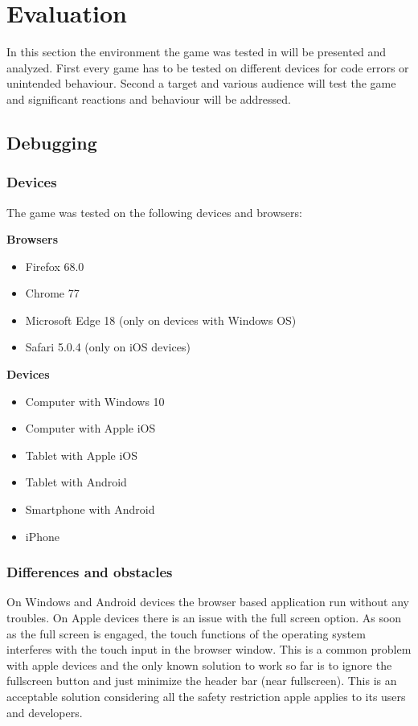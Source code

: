 
\chapter{Evaluation}\label{ch:evaluation}
In this section the environment the game was tested in will be presented and analyzed.
First every game has to be tested on different devices for code errors or unintended behaviour.
Second a target and various audience will test the game and significant reactions and behaviour will be addressed.

\section{Debugging}\label{sec:debugging}
\subsection{Devices}\label{subsec:devices}
The game was tested on the following devices and browsers:

\textbf{Browsers}
\begin{itemize}
    \item Firefox 68.0
    \item Chrome 77
    \item Microsoft Edge 18 (only on devices with Windows OS)
    \item Safari 5.0.4 (only on iOS devices)
\end{itemize}

\textbf{Devices}
\begin{itemize}
    \item Computer with Windows 10
    \item Computer with Apple iOS
    \item Tablet with Apple iOS
    \item Tablet with Android
    \item Smartphone with Android
    \item iPhone
\end{itemize}

\subsection{Differences and obstacles}\label{subsec:differences-and-obstacles}
On Windows and Android devices the browser based application run without any troubles.
On Apple devices there is an issue with the full screen option.
As soon as the full screen is engaged, the touch functions of the operating system interferes with the touch input in the
browser window.
This is a common problem with apple devices and the only known solution to work so far is to ignore the fullscreen button
and just minimize the header bar (near fullscreen).
This is an acceptable solution considering all the safety restriction apple applies to its users and developers.

